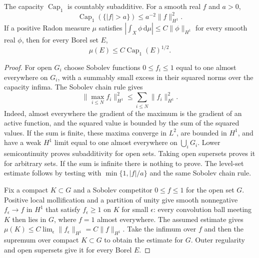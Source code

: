 \begin{lemma}\label{hessian:sobolev-capacity-tools}
The capacity $\operatorname{Cap}_1$ is countably subadditive. For a
smooth real $f$ and $a>0$,
\[
 \operatorname{Cap}_1(\{|f|>a\})\leq a^{-2}\|f\|_{H^1}^2.
\]
If a positive Radon measure $\mu$ satisfies
$|\int_X\phi\,\mathrm d\mu|\leq C\|\phi\|_{H^1}$ for every smooth real
$\phi$, then for every Borel set $E$,
\[
 \mu(E)\leq C\operatorname{Cap}_1(E)^{1/2}.
\]
\end{lemma}
\begin{proof}
For open $G_i$ choose Sobolev functions $0\leq f_i\leq1$ equal to
one almost everywhere on $G_i$, with a summably small excess in their
squared norms over the capacity infima. The Sobolev chain rule gives
\[
 \|\max_{i\leq N}f_i\|_{H^1}^2\leq\sum_{i\leq N}\|f_i\|_{H^1}^2.
\]
Indeed, almost everywhere the gradient of the maximum is the gradient
of an active function, and the squared value is bounded by the sum of
the squared values. If the sum is finite, these maxima converge in
$L^2$, are bounded in $H^1$, and have a weak $H^1$ limit equal to one
almost everywhere on $\bigcup_iG_i$. Lower semicontinuity proves
subadditivity for open sets. Taking open supersets proves it for
arbitrary sets. If the sum is infinite there is nothing to prove.
The level-set estimate follows by testing with
$\min\{1,|f|/a\}$ and the same Sobolev chain rule.

Fix a compact $K\subset G$ and a Sobolev competitor $0\leq f\leq1$
for the open set $G$. Positive local mollification and a partition of
unity give smooth nonnegative $f_\epsilon\to f$ in $H^1$ that satisfy
$f_\epsilon\geq1$ on $K$ for small $\epsilon$: every convolution ball
meeting $K$ then lies in $G$, where $f=1$ almost everywhere.
The assumed estimate gives
$\mu(K)\leq C\lim_\epsilon\|f_\epsilon\|_{H^1}=C\|f\|_{H^1}$.
Take the infimum over $f$ and then the supremum over compact $K\subset G$
to obtain the estimate for $G$. Outer regularity and open supersets
give it for every Borel $E$.
\end{proof}

